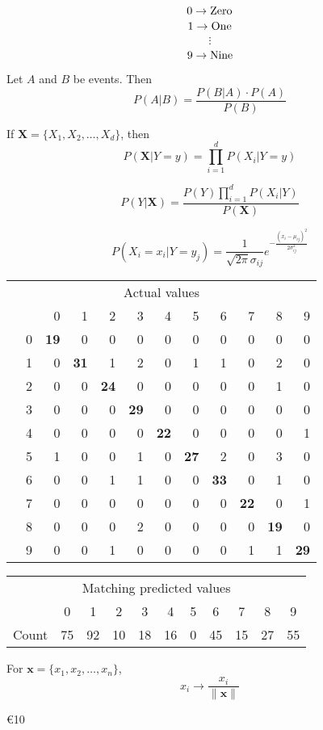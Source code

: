 \documentclass{article}
\begin{document}
$$0\rightarrow \textnormal{Zero}$$
$$1\rightarrow\textnormal{One}$$
$$\vdots$$
$$9\rightarrow\textnormal{Nine}$$

Let $A$ and $B$ be events. Then
$$P(A|B)=\frac{P(B|A)\cdot P(A)}{P(B)}$$

If $\mathbf{X}=\{X_{1},X_{2},\ldots,X_{d}\}$, then 
$$P(\mathbf{X}|Y=y) = \prod_{i=1}^{d}P(X_{i}|Y=y)$$

$$P(Y|\mathbf{X})=\frac{P(Y)\prod_{i=1}^{d}P(X_{i}|Y)}{P(\mathbf{X})}$$

$$P(X_{i}=x_{i}|Y=y_{j})=\frac{1}{\sqrt{2\pi}\sigma_{ij}}e^{-\frac{(x_{i}-\mu_{ij})^2}{2\sigma_{ij}^{2}}}$$

\begin{table}
	\centering
	\begin{tabular}{cl|rrrrrrrrrr}
		\multicolumn{12}{c}{Actual values}\\
		&&0 &1 &2&3&4&5&6&7&8&9\\\cline{2-12}
		\multirow{10}{*}{\STAB{\rotatebox[origin=c]{90}{Linear SVN prediction}}}
		&0&\bf{19}&0&0&0&0&0&0&0&0&0\\
		&1&0&\bf{31}&1&2&0&1&1&0&2&0\\
		&2&0&0&\bf{24}&0&0&0&0&0&1&0\\
		&3&0&0&0&\bf{29}&0&0&0&0&0&0\\
		&4&0&0&0&0&\bf{22}&0&0&0&0&1\\
		&5&1&0&0&1&0&\bf{27}&2&0&3&0\\
		&6&0&0&1&1&0&0&\bf{33}&0&1&0\\
		&7&0&0&0&0&0&0&0&\bf{22}&0&1\\
		&8&0&0&0&2&0&0&0&0&\bf{19}&0\\
		&9&0&0&1&0&0&0&0&1&1&\bf{29}\\
	\end{tabular}
\end{table}

\begin{table}
	\centering
	\begin{tabular}{lcccccccccc}
		\multicolumn{11}{c}{Matching predicted values}\\
		&0 &1 &2&3&4&5&6&7&8&9\\\cline{2-11}
		Count &75&92&10&18&16&0&45&15&27&55\\
	\end{tabular}
\end{table}

For $\mathbf{x}=\{x_{1},x_{2},\ldots,x_{n}\}$,
$$ x_{i}\rightarrow \frac{x_{i}}{\|\mathbf{x}\|}$$

\euro{10}
\end{document}
